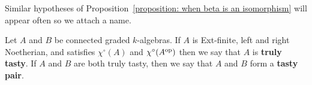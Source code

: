 Similar hypotheses of Proposition~\ref{proposition: when beta is an isomorphism} will appear often so we attach a name. 

\begin{definition} \label{definition: tasty pair}
  Let \(A\) and \(B\) be connected graded \(k\)-algebras. If \(A\) is Ext-finite, left and right Noetherian, and satisfies \(\chi^\circ(A)\) and \(\chi^\circ(A^{\operatorname{op}})\) then we say that \(A\) is \textbf{truly tasty}. If \(A\) and \(B\) are both truly tasty, then we say that \(A\) and \(B\) form a \textbf{tasty pair}. 
\end{definition}
